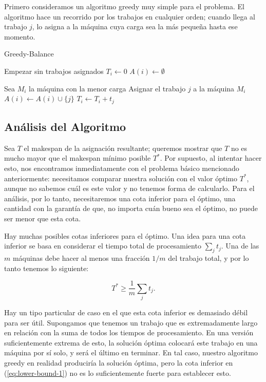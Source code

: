 \documentclass{report}
\begin{document}
	Primero consideramos un algoritmo greedy muy simple para el problema. El algoritmo hace un recorrido por los trabajos en cualquier orden; cuando llega al trabajo \( j \), lo asigna a la máquina cuya carga sea la más pequeña hasta ese momento.
	

\begin{algorithm}
	\caption{Greedy-Balance}
	\label{alg:greedy-balance}
		\State Empezar sin trabajos asignados
		\State \( T_i \gets 0 \) 
		\State \( A(i) \gets \emptyset \) 
		\EndFor
		
		\State Sea \( M_i \) la máquina con la menor carga
		\State Asignar el trabajo \( j \) a la máquina \( M_i \)
		\State \( A(i) \gets A(i) \cup \{j\} \)
		\State \( T_i \gets T_i + t_j \)
		\EndFor
\end{algorithm}

	
	\subsection*{Análisis del Algoritmo}
	
	Sea \( T \) el makespan de la asignación resultante; queremos mostrar que \( T \) no es mucho mayor que el makespan mínimo posible \( T^* \). Por supuesto, al intentar hacer esto, nos encontramos inmediatamente con el problema básico mencionado anteriormente: necesitamos comparar nuestra solución con el valor óptimo \( T^* \), aunque no sabemos cuál es este valor y no tenemos forma de calcularlo. Para el análisis, por lo tanto, necesitaremos una cota inferior para el óptimo, una cantidad con la garantía de que, no importa cuán bueno sea el óptimo, no puede ser menor que esta cota.
	
	Hay muchas posibles cotas inferiores para el óptimo. Una idea para una cota inferior se basa en considerar el tiempo total de procesamiento \( \sum_j t_j \). Una de las \( m \) máquinas debe hacer al menos una fracción \( 1/m \) del trabajo total, y por lo tanto tenemos lo siguiente:
	
	\begin{equation} \label{eq:lower-bound-1}
		T^* \geq \frac{1}{m} \sum_j t_j.
	\end{equation}
	
	Hay un tipo particular de caso en el que esta cota inferior es demasiado débil para ser útil. Supongamos que tenemos un trabajo que es extremadamente largo en relación con la suma de todos los tiempos de procesamiento. En una versión suficientemente extrema de esto, la solución óptima colocará este trabajo en una máquina por sí solo, y será el último en terminar. En tal caso, nuestro algoritmo greedy en realidad produciría la solución óptima, pero la cota inferior en (\ref{eq:lower-bound-1}) no es lo suficientemente fuerte para establecer esto.
	
\end{document}
